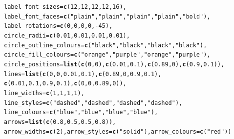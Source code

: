 \documentclass{article}\usepackage[]{graphicx}\usepackage[]{color}
\makeatletter
\newcommand{\hlnum}[1]{\textcolor[rgb]{0.686,0.059,0.569}{#1}}%
\newcommand{\hlstr}[1]{\textcolor[rgb]{0.192,0.494,0.8}{#1}}%
\newcommand{\hlopt}[1]{\textcolor[rgb]{0,0,0}{#1}}%
\newcommand{\hlstd}[1]{\textcolor[rgb]{0.345,0.345,0.345}{#1}}%
\newcommand{\hlkwc}[1]{\textcolor[rgb]{0.333,0.667,0.333}{#1}}%
\newcommand{\hlkwd}[1]{\textcolor[rgb]{0.737,0.353,0.396}{\textbf{#1}}}%
\newenvironment{kframe}{%
 \def\at@end@of@kframe{}%
 \ifinner\ifhmode%
  \def\at@end@of@kframe{\end{minipage}}%
  \begin{minipage}{\columnwidth}%
 \fi\fi%
 \def\FrameCommand##1{\hskip\@totalleftmargin \hskip-\fboxsep
 \colorbox{shadecolor}{##1}\hskip-\fboxsep
     \hskip-\linewidth \hskip-\@totalleftmargin \hskip\columnwidth}%
 \MakeFramed {\advance\hsize-\width
   \@totalleftmargin\z@ \linewidth\hsize
   \@setminipage}}%
 {\par\unskip\endMakeFramed%
 \at@end@of@kframe}
\newenvironment{knitrout}{}{} %
\makeatother
\begin{document}
\begin{knitrout}
\begin{kframe}
\begin{alltt}
        \hlkwc{label_font_sizes}\hlstd{=}\hlkwd{c}\hlstd{(}\hlnum{12}\hlstd{,}\hlnum{12}\hlstd{,}\hlnum{12}\hlstd{,}\hlnum{12}\hlstd{,}\hlnum{16}\hlstd{),}
        \hlkwc{label_font_faces}\hlstd{=}\hlkwd{c}\hlstd{(}\hlstr{"plain"}\hlstd{,}\hlstr{"plain"}\hlstd{,}\hlstr{"plain"}\hlstd{,}\hlstr{"plain"}\hlstd{,}\hlstr{"bold"}\hlstd{),}
        \hlkwc{label_rotations}\hlstd{=}\hlkwd{c}\hlstd{(}\hlnum{0}\hlstd{,}\hlnum{0}\hlstd{,}\hlnum{0}\hlstd{,}\hlnum{0}\hlstd{,}\hlopt{-}\hlnum{45}\hlstd{),}
        \hlkwc{circle_radii}\hlstd{=}\hlkwd{c}\hlstd{(}\hlnum{0.01}\hlstd{,}\hlnum{0.01}\hlstd{,}\hlnum{0.01}\hlstd{,}\hlnum{0.01}\hlstd{),}
        \hlkwc{circle_outline_colours}\hlstd{=}\hlkwd{c}\hlstd{(}\hlstr{"black"}\hlstd{,}\hlstr{"black"}\hlstd{,}\hlstr{"black"}\hlstd{,}\hlstr{"black"}\hlstd{),}
        \hlkwc{circle_fill_colours}\hlstd{=}\hlkwd{c}\hlstd{(}\hlstr{"orange"}\hlstd{,}\hlstr{"purple"}\hlstd{,}\hlstr{"orange"}\hlstd{,}\hlstr{"purple"}\hlstd{),}
        \hlkwc{circle_positions}\hlstd{=}\hlkwd{list}\hlstd{(}\hlkwd{c}\hlstd{(}\hlnum{0}\hlstd{,}\hlnum{0}\hlstd{),}\hlkwd{c}\hlstd{(}\hlnum{0.01}\hlstd{,}\hlnum{0.1}\hlstd{),}\hlkwd{c}\hlstd{(}\hlnum{0.89}\hlstd{,}\hlnum{0}\hlstd{),}\hlkwd{c}\hlstd{(}\hlnum{0.9}\hlstd{,}\hlnum{0.1}\hlstd{)),}
        \hlkwc{lines}\hlstd{=}\hlkwd{list}\hlstd{(}\hlkwd{c}\hlstd{(}\hlnum{0}\hlstd{,}\hlnum{0}\hlstd{,}\hlnum{0.01}\hlstd{,}\hlnum{0.1}\hlstd{),}\hlkwd{c}\hlstd{(}\hlnum{0.89}\hlstd{,}\hlnum{0}\hlstd{,}\hlnum{0.9}\hlstd{,}\hlnum{0.1}\hlstd{),}
                \hlkwd{c}\hlstd{(}\hlnum{0.01}\hlstd{,}\hlnum{0.1}\hlstd{,}\hlnum{0.9}\hlstd{,}\hlnum{0.1}\hlstd{),}\hlkwd{c}\hlstd{(}\hlnum{0}\hlstd{,}\hlnum{0}\hlstd{,}\hlnum{0.89}\hlstd{,}\hlnum{0}\hlstd{)),}
        \hlkwc{line_widths}\hlstd{=}\hlkwd{c}\hlstd{(}\hlnum{1}\hlstd{,} \hlnum{1}\hlstd{,} \hlnum{1}\hlstd{,} \hlnum{1}\hlstd{),}
        \hlkwc{line_styles}\hlstd{=}\hlkwd{c}\hlstd{(}\hlstr{"dashed"}\hlstd{,} \hlstr{"dashed"}\hlstd{,} \hlstr{"dashed"}\hlstd{,} \hlstr{"dashed"}\hlstd{),}
        \hlkwc{line_colours}\hlstd{=}\hlkwd{c}\hlstd{(}\hlstr{"blue"}\hlstd{,}\hlstr{"blue"}\hlstd{,}\hlstr{"blue"}\hlstd{,}\hlstr{"blue"}\hlstd{),}
        \hlkwc{arrows}\hlstd{=}\hlkwd{list}\hlstd{(}\hlkwd{c}\hlstd{(}\hlnum{0.8}\hlstd{,}\hlnum{0.5}\hlstd{,}\hlnum{0.5}\hlstd{,}\hlnum{0.8}\hlstd{)),}
        \hlkwc{arrow_widths}\hlstd{=}\hlkwd{c}\hlstd{(}\hlnum{2}\hlstd{),} \hlkwc{arrow_styles}\hlstd{=}\hlkwd{c}\hlstd{(}\hlstr{"solid"}\hlstd{),} \hlkwc{arrow_colours}\hlstd{=}\hlkwd{c}\hlstd{(}\hlstr{"red"}\hlstd{))}
\end{alltt}
\end{kframe}


\end{knitrout}
\end{document}
